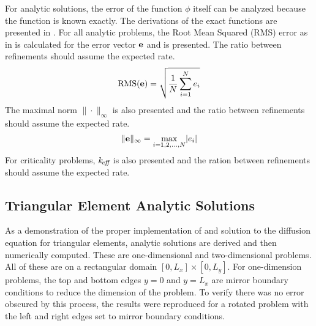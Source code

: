   For analytic solutions, the error of the function $\phi$ itself can be 
  analyzed because the function is known exactly. The derivations of the exact 
  functions are presented in . For all analytic 
  problems, the Root Mean Squared (RMS) error as in  is calculated
  for the error vector $\mathbf{e}$ and is presented. The ratio between refinements 
  should assume the expected rate.
  \begin{equation} \label{eq:rms}
    \text{RMS}(\mathbf{e}) = \sqrt{\frac{1}{N} \sum_{i=1}^{N} e_i}
  \end{equation}
  The maximal norm $\| \cdot \|_{\infty}$ is also presented and the ratio 
  between refinements should assume the expected rate.
  \begin{equation} \label{eq:infnorm}
    \|\mathbf{e}\|_{\infty} = \max_{i=1,2,\ldots,N} \lvert e_i \rvert
  \end{equation}
  For criticality  problems, $k_{\!\mbox{\scriptsize \em eff}}$ is also presented and the ration between
  refinements should assume the expected rate.
  \subsection{Triangular Element Analytic Solutions}
    As a demonstration of the proper implementation of and solution to the 
    diffusion equation for triangular elements, analytic solutions are 
    derived and then numerically computed. These are one-dimensional and
    two-dimensional problems. All of these are on a rectangular domain 
    $[0,L_x] \times [0,L_y]$. For one-dimension problems, the top and 
    bottom edges $y=0$ and $y=L_x$ are mirror boundary conditions to reduce the
    dimension of the problem. To verify there was no error obscured by this 
    process, the results were reproduced for a rotated problem with the left and 
    right edges set to mirror boundary conditions.
